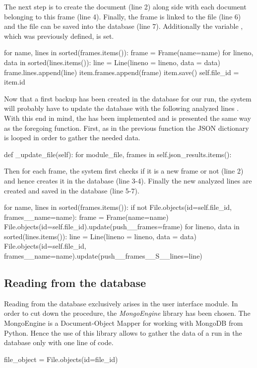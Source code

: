 The next step is to create the  document (line 2) along side with each  document belonging to this frame (line 4). Finally, the frame is linked to the file (line 6) and the file can be saved into the database (line 7). Additionally the variable , which was previously defined, is set.
\begin{python}
for name, lines in sorted(frames.items()):
    frame = Frame(name=name)
    for lineno, data in sorted(lines.items()):
        line = Line(lineno = lineno, data = data)
        frame.lines.append(line)
    item.frames.append(frame)
    item.save()
self.file_id = item.id
\end{python}

Now that a first backup has been created in the database for our run, the system will probably have to update the database with the following analyzed lines . With this end in mind, the  has been implemented and is presented the same way as the foregoing function. First, as in the previous function the JSON dictionary is looped in order to gather the needed data.
\begin{python}
def _update_file(self):
  for module_file, frames in self.json_results.items():
\end{python}

Then for each frame, the system first checks if it is a new frame or not (line 2) and hence creates it in the database (line 3-4). Finally the new analyzed lines are created and saved in the database (line 5-7).
\begin{python}
for name, lines in sorted(frames.items()):
    if not File.objects(id=self.file_id, frames__name=name):
        frame = Frame(name=name)
        File.objects(id=self.file_id).update(push__frames=frame)
    for lineno, data in sorted(lines.items()):
        line = Line(lineno = lineno, data = data)
        File.objects(id=self.file_id, frames__name=name).update(push__frames__S__lines=line)
\end{python}

\subsection{Reading from the database}

Reading from the database exclusively arises in the user interface module. In order to cut down the procedure, the \textit{MongoEngine} library has been chosen. The MongoEngine is a Document-Object Mapper for working with MongoDB from Python. Hence the use of this library allows to gather the data of a run in the database only with one line of code.
\begin{python}
file_object = File.objects(id=file_id)
\end{python} 

